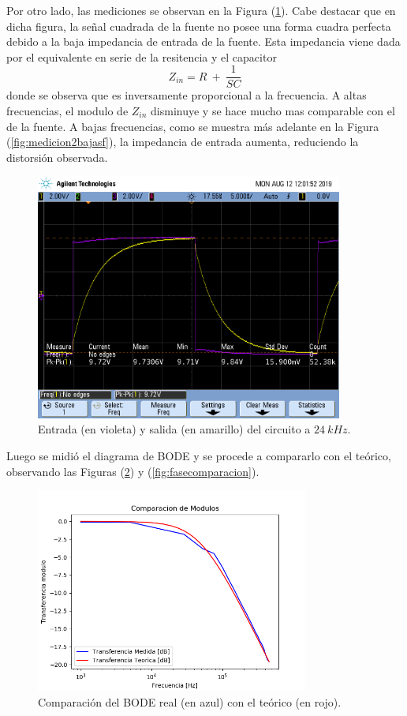 \documentclass[a4paper]{article}
\begin{document}
Por otro lado, las mediciones se observan en la Figura (\ref{fig:medicion2}). Cabe destacar que en dicha figura, la señal cuadrada de la fuente no posee una forma cuadra perfecta debido a la baja impedancia de entrada de la fuente. Esta impedancia viene dada por el equivalente en serie de la resitencia y el capacitor
\[
	Z_{in} = R \ + \ \frac{1}{SC}
\]
donde se observa que es inversamente proporcional a la frecuencia. A altas frecuencias, el modulo de $Z_{in}$ disminuye y se hace mucho mas comparable con el de la fuente. A bajas frecuencias, como se muestra más adelante en la Figura (\ref{fig:medicion2bajasf}), la impedancia de entrada aumenta, reduciendo la distorsión observada.

\begin{figure}[H]
	\centering
	\includegraphics[width=0.9\textwidth , trim={0.7cm 6.25cm  0 3.5cm},clip]{scope_1}
\caption{Entrada (en violeta) y salida (en amarillo) del circuito a $ 24 \ kHz $.}
	\label{fig:medicion2}
\end{figure}

Luego se midió el diagrama de BODE y se procede a compararlo con el teórico, observando las Figuras (\ref{fig:bodecomparacion}) y (\ref{fig:fasecomparacion}).

\begin{figure}[H]
	\centering
	\includegraphics[width=0.8\textwidth]{BodeRealVsMedido}
\caption{Comparación del BODE real (en azul) con el teórico (en rojo).}
	\label{fig:bodecomparacion}
\end{figure}
\end{document}
